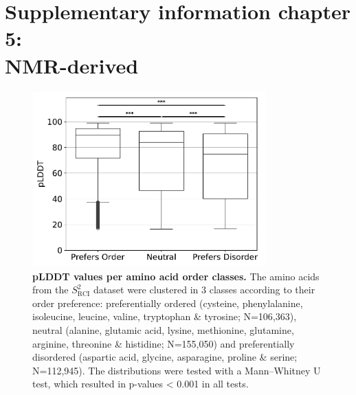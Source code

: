 \chapter*{Supplementary information chapter 5: \\NMR-derived}
\setcounter{chapter}{5}

\setcounter{figure}{0} %
\renewcommand{\figurename}{Supplementary Fig.}

\setcounter{table}{0} %
\renewcommand{\tablename}{Supplementary Table}

\newpage


\begin{figure}[H]
    \centering
    \includegraphics[width=0.8\textwidth]{pLDDT/plddt_figures/box_plot_rciset_plddt_dynamine_classes.pdf}
    \caption{\textbf{pLDDT values per amino acid order classes.} The amino acids from the $S^{2}_{\text{RCI}}$ dataset were clustered in 3 classes according to their order preference: preferentially ordered (cysteine, phenylalanine, isoleucine, leucine, valine, tryptophan \& tyrosine; N=106,363), neutral (alanine, glutamic acid, lysine, methionine, glutamine, arginine, threonine \& histidine; N=155,050) and preferentially disordered (aspartic acid, glycine, asparagine, proline \& serine; N=112,945). The distributions were tested with a Mann–Whitney U test, which resulted in p-values < 0.001 in all tests.}
    \label{fig:plddt_aa_classes_boxplot}
\end{figure}


